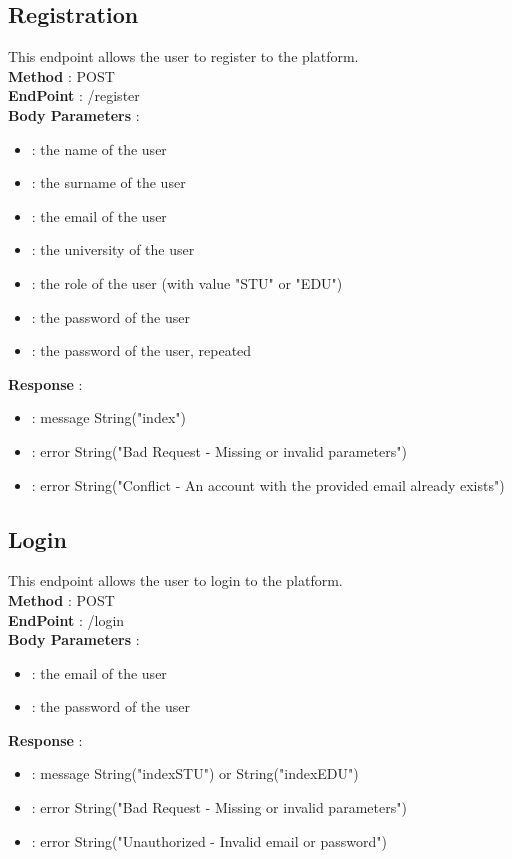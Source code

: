 \subsection*{Registration}
This endpoint allows the user to register to the platform.\\
\textbf{Method} : POST \\
\textbf{EndPoint} : /register \\
\textbf{Body Parameters} :
\begin{itemize}
    \item {} : the name of the user
    \item {} : the surname of the user
    \item {} : the email of the user
    \item {} : the university of the user
    \item {} : the role of the user (with value "STU" or "EDU")
    \item {} : the password of the user
    \item {} : the password of the user, repeated
\end{itemize}
\textbf{Response} :
\begin{itemize}
    \item {} : message String("index")
    \item {} : error String("Bad Request - Missing or invalid parameters")
    \item {} : error String("Conflict - An account with the provided email already exists")
\end{itemize}

\subsection*{Login}
This endpoint allows the user to login to the platform.\\
\textbf{Method} : POST \\
\textbf{EndPoint} : /login \\
\textbf{Body Parameters} :
\begin{itemize}
    \item {} : the email of the user
    \item {} : the password of the user
\end{itemize}
\textbf{Response} :
\begin{itemize}
    \item {} : message String("indexSTU") or String("indexEDU") 
    \item {} : error String("Bad Request - Missing or invalid parameters")
    \item {} : error String("Unauthorized - Invalid email or password")
\end{itemize}

